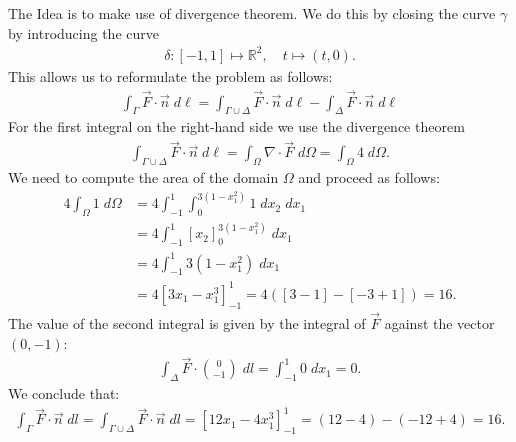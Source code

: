 \documentclass[11pt]{article}
\begin{document}
\begin{solution}
    The Idea is to make use of divergence theorem. 
    We do this by closing the curve $\gamma$ by introducing the curve 
    \begin{gather*}
        \delta: [-1,1] \mapsto \mathbb{R}^2, \quad t \mapsto  (t,0).
    \end{gather*}
    This allows us to reformulate the problem as follows:
    \begin{gather*}
        \int_{\Gamma} \vec{F} \cdot \vec{n} \; d\ell
        =
        \int_{\Gamma\cup \Delta} \vec{F} \cdot \vec{n} \; d\ell
        -
        \int_{\Delta} \vec{F}\cdot \vec{n} \;d \ell
    \end{gather*}
    For the first integral on the right-hand side we use the divergence theorem
    \begin{align*}
        \int_{\Gamma\cup\Delta} \vec{F} \cdot \vec{n} \; d\ell 
        = 
        \int_{\Omega} \nabla\cdot\vec{F}\;d \Omega
        =
        \int_{\Omega} 4\;d \Omega
        .
    \end{align*}
    We need to compute the area of the domain $\Omega$ and proceed as follows: 
    \begin{align*}
        4\int_{\Omega} 1\;d \Omega
        &=
        4 \int_{-1}^1\int_{0}^{3(1-x_{1}^2)} 1 \;d x_{2} \;d x_{1}
        \\&=
        4 \int_{-1}^1\left[x_{2}\right]_{0}^{3(1-x_{1}^2)} \;d x_{1}
        \\&=
        4 \int_{-1}^1 3( 1-x_{1}^2)\;d x_{1}
        \\&=
        4 \left[ 3 x_{1} - x_{1}^3 \right]_{-1}^1
        =
        4 \left( \left[ 3 - 1 \right] - \left[ -3 + 1 \right] \right)
        = 
        16
        .
    \end{align*}
    The value of the second integral is given by the integral of $\vec{F}$ against the vector $(0,-1)$:
    \begin{align*}
        \int_{\Delta} \vec{F} \cdot \binom{0}{-1} \; dl
        =
        \int_{-1}^1 0 \; dx_{1}
        =
        0
        .
    \end{align*}
    We conclude that:
    \begin{align*}
        \int_{\Gamma} \vec{F} \cdot \vec{n} \; dl
        = 
        \int_{\Gamma\cup \Delta} \vec{F} \cdot \vec{n} \; dl
        =
        \left[ 12 x_{1} - 4 x_{1}^3 \right]_{-1}^1
        =
        ( 12 - 4 ) - ( -12 + 4 )
        = 
        16.
    \end{align*}
\end{solution}
\end{document}

